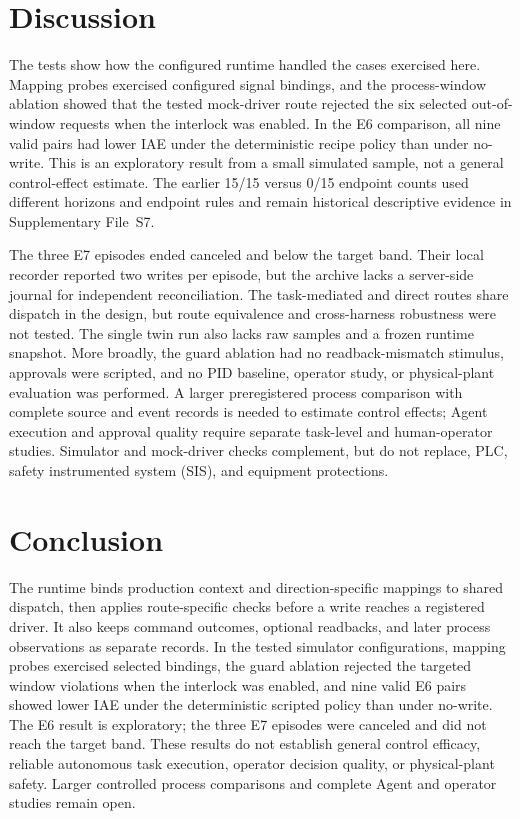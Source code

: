 \section{Discussion}
\label{sec:discussion}
The tests show how the configured runtime handled the cases exercised here. Mapping probes exercised configured signal bindings, and the process-window ablation showed that the tested mock-driver route rejected the six selected out-of-window requests when the interlock was enabled. In the E6 comparison, all nine valid pairs had lower IAE under the deterministic recipe policy than under no-write. This is an exploratory result from a small simulated sample, not a general control-effect estimate. The earlier 15/15 versus 0/15 endpoint counts used different horizons and endpoint rules and remain historical descriptive evidence in Supplementary File~S7.

The three E7 episodes ended canceled and below the target band. Their local recorder reported two writes per episode, but the archive lacks a server-side journal for independent reconciliation. The task-mediated and direct routes share dispatch in the design, but route equivalence and cross-harness robustness were not tested. The single twin run also lacks raw samples and a frozen runtime snapshot. More broadly, the guard ablation had no readback-mismatch stimulus, approvals were scripted, and no PID baseline, operator study, or physical-plant evaluation was performed. A larger preregistered process comparison with complete source and event records is needed to estimate control effects; Agent execution and approval quality require separate task-level and human-operator studies. Simulator and mock-driver checks complement, but do not replace, PLC, safety instrumented system (SIS), and equipment protections.

\section{Conclusion}
\label{sec:conclusion}
The runtime binds production context and direction-specific mappings to shared dispatch, then applies route-specific checks before a write reaches a registered driver. It also keeps command outcomes, optional readbacks, and later process observations as separate records. In the tested simulator configurations, mapping probes exercised selected bindings, the guard ablation rejected the targeted window violations when the interlock was enabled, and nine valid E6 pairs showed lower IAE under the deterministic scripted policy than under no-write. The E6 result is exploratory; the three E7 episodes were canceled and did not reach the target band. These results do not establish general control efficacy, reliable autonomous task execution, operator decision quality, or physical-plant safety. Larger controlled process comparisons and complete Agent and operator studies remain open.
